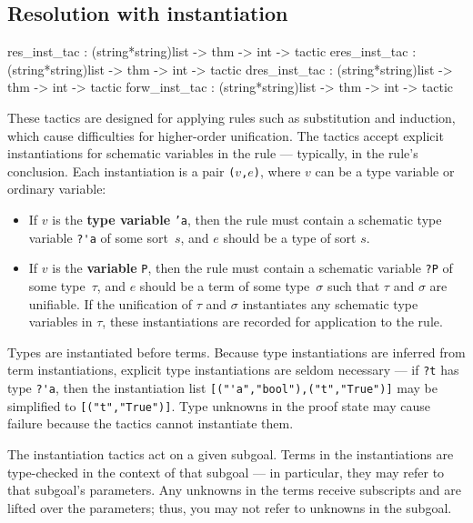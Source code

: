 \subsection{Resolution with instantiation} \label{res_inst_tac}
\begin{ttbox} 
res_inst_tac  : (string*string)list -> thm -> int -> tactic
eres_inst_tac : (string*string)list -> thm -> int -> tactic
dres_inst_tac : (string*string)list -> thm -> int -> tactic
forw_inst_tac : (string*string)list -> thm -> int -> tactic
\end{ttbox}
These tactics are designed for applying rules such as substitution and
induction, which cause difficulties for higher-order unification.  The
tactics accept explicit instantiations for schematic variables in the rule
--- typically, in the rule's conclusion.  Each instantiation is a pair
{\tt($v$,$e$)}, where $v$ can be a type variable or ordinary variable:
\begin{itemize}
\item If $v$ is the {\bf type variable} {\tt'a}, then
the rule must contain a schematic type variable \verb$?'a$ of some
sort~$s$, and $e$ should be a type of sort $s$.

\item If $v$ is the {\bf variable} {\tt P}, then
the rule must contain a schematic variable \verb$?P$ of some type~$\tau$,
and $e$ should be a term of some type~$\sigma$ such that $\tau$ and
$\sigma$ are unifiable.  If the unification of $\tau$ and $\sigma$
instantiates any schematic type variables in $\tau$, these instantiations
are recorded for application to the rule.
\end{itemize}
Types are instantiated before terms.  Because type instantiations are
inferred from term instantiations, explicit type instantiations are seldom
necessary --- if \verb$?t$ has type \verb$?'a$, then the instantiation list
\verb$[("'a","bool"),("t","True")]$ may be simplified to
\verb$[("t","True")]$.  Type unknowns in the proof state may cause
failure because the tactics cannot instantiate them.

The instantiation tactics act on a given subgoal.  Terms in the
instantiations are type-checked in the context of that subgoal --- in
particular, they may refer to that subgoal's parameters.  Any unknowns in
the terms receive subscripts and are lifted over the parameters; thus, you
may not refer to unknowns in the subgoal.


